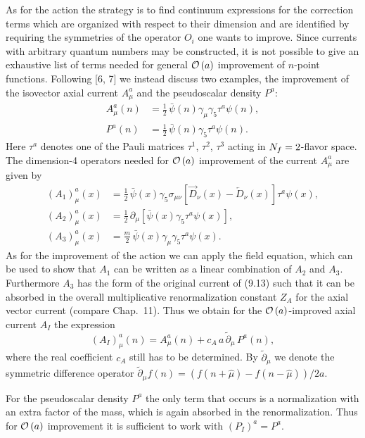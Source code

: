 As for the action the strategy is to find continuum expressions for the
correction terms which are organized with respect to their dimension and are
identified by requiring the symmetries of the operator $O_i$ one wants to
improve. Since currents with arbitrary quantum numbers may be constructed, it
is not possible to give an exhaustive list of terms needed for general
$\mathcal{O}\left(a\right)$ improvement of $n$-point functions. Following [6, 7] we instead
discuss two examples, the improvement of the isovector axial current $A_\mu^a$
and the pseudoscalar density $P^a$:
\begin{align}
  A^a_\mu(n) &= \frac{1}{2}\,\bar\psi(n)\gamma_\mu\gamma_5\tau^a\psi(n) , \nonumber\\
  P^a(n) &= \frac{1}{2}\,\bar\psi(n)\gamma_5\tau^a\psi(n) .
\end{align}
Here $\tau^a$ denotes one of the Pauli matrices $\tau^1$, $\tau^2$, $\tau^3$
acting in $N_f = 2$-flavor space. The dimension-4 operators needed for
$\mathcal{O}\left(a\right)$ improvement of the current $A^a_\mu$ are given by
\begin{align}
  (A_1)^a_\mu(x) &= \frac{1}{2}\,\bar\psi(x)\gamma_5\sigma_{\mu\nu}
    \left[\overrightarrow{D}_\nu(x) - \overleftarrow{D}_\nu(x)\right]
    \tau^a\psi(x) , \nonumber\\
  (A_2)^a_\mu(x) &= \frac{1}{2}\,\partial_\mu\left[\bar\psi(x)\gamma_5\tau^a\psi(x)\right] , \nonumber\\
  (A_3)^a_\mu(x) &= \frac{m}{2}\,\bar\psi(x)\gamma_\mu\gamma_5\tau^a\psi(x) .
\end{align}
As for the improvement of the action we can apply the field equation, which
can be used to show that $A_1$ can be written as a linear combination of $A_2$
and $A_3$. Furthermore $A_3$ has the form of the original current of (9.13)
such that it can be absorbed in the overall multiplicative renormalization
constant $Z_A$ for the axial vector current (compare Chap.~11). Thus we obtain
for the $\mathcal{O}\left(a\right)$-improved axial current $A_I$ the expression
\begin{equation}
  (A_I)^a_\mu(n) = A^a_\mu(n) + c_A\,a\,\widetilde{\partial}_\mu\,P^a(n) ,
\end{equation}
where the real coefficient $c_A$ still has to be determined. By
$\widetilde{\partial}_\mu$ we denote the symmetric difference operator
$\widetilde{\partial}_\mu f(n) = (f(n + \hat\mu) - f(n - \hat\mu))/2a$.

For the pseudoscalar density $P^a$ the only term that occurs is a
normalization with an extra factor of the mass, which is again absorbed in the
renormalization. Thus for $\mathcal{O}\left(a\right)$ improvement it is sufficient to work
with $(P_I)^a = P^a$.

